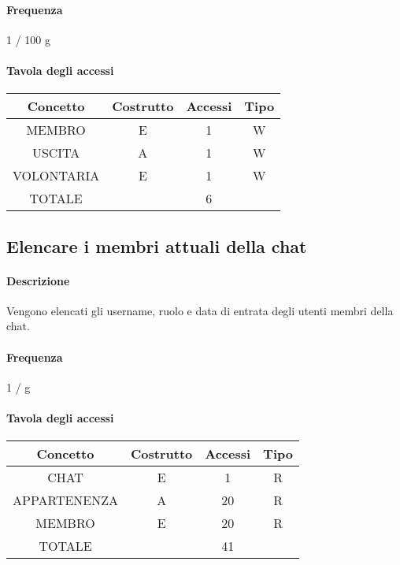 \documentclass[a4paper,12pt]{report}
\begin{document}
\paragraph{Frequenza} 1 / 100 g 
\begin{table}[H]
\paragraph{Tavola degli accessi\newline}
\begin{tabular}{|c|c|c|c|}
\hline
Concetto   & Costrutto & Accessi & Tipo \\ \hline
MEMBRO     & E         & 1       & W    \\ \hline
USCITA     & A         & 1       & W    \\ \hline
VOLONTARIA & E         & 1       & W    \\ \hline
TOTALE     &           & 6       &      \\ \hline
\end{tabular}
\end{table}
\subsection{Elencare i membri attuali della chat} \label{membri_chat}
\paragraph{Descrizione} Vengono elencati gli username, ruolo e data di entrata degli utenti membri della chat.
\paragraph{Frequenza} 1 / g
\begin{table}[H]
\paragraph{Tavola degli accessi\newline}
\begin{tabular}{|c|c|c|c|}
\hline
Concetto     & Costrutto & Accessi & Tipo \\ \hline
CHAT         & E         & 1       & R    \\ \hline
APPARTENENZA & A         & 20      & R    \\ \hline
MEMBRO       & E         & 20      & R    \\ \hline
TOTALE       &           & 41      &      \\ \hline
\end{tabular}
\end{table}
\end{document}
